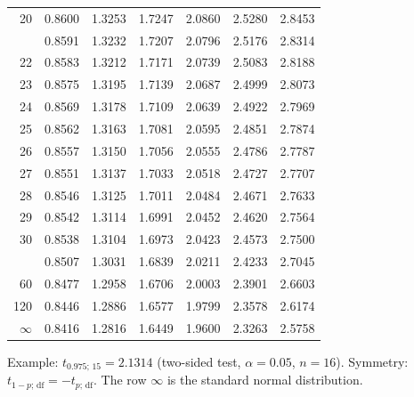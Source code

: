 \documentclass[a4paper]{article}
\theoremstyle{break}
\begin{document}
\begin{table}[H]
\begin{footnotesize}
\begin{tabular}{r*{6}{c}}
20 & 0.8600 & 1.3253 & 1.7247 & 2.0860 & 2.5280 & 2.8453\\
\addlinespace
21 & 0.8591 & 1.3232 & 1.7207 & 2.0796 & 2.5176 & 2.8314\\
22 & 0.8583 & 1.3212 & 1.7171 & 2.0739 & 2.5083 & 2.8188\\
23 & 0.8575 & 1.3195 & 1.7139 & 2.0687 & 2.4999 & 2.8073\\
24 & 0.8569 & 1.3178 & 1.7109 & 2.0639 & 2.4922 & 2.7969\\
25 & 0.8562 & 1.3163 & 1.7081 & 2.0595 & 2.4851 & 2.7874\\
26 & 0.8557 & 1.3150 & 1.7056 & 2.0555 & 2.4786 & 2.7787\\
27 & 0.8551 & 1.3137 & 1.7033 & 2.0518 & 2.4727 & 2.7707\\
28 & 0.8546 & 1.3125 & 1.7011 & 2.0484 & 2.4671 & 2.7633\\
29 & 0.8542 & 1.3114 & 1.6991 & 2.0452 & 2.4620 & 2.7564\\
30 & 0.8538 & 1.3104 & 1.6973 & 2.0423 & 2.4573 & 2.7500\\
\addlinespace
40 & 0.8507 & 1.3031 & 1.6839 & 2.0211 & 2.4233 & 2.7045\\
60 & 0.8477 & 1.2958 & 1.6706 & 2.0003 & 2.3901 & 2.6603\\
120 & 0.8446 & 1.2886 & 1.6577 & 1.9799 & 2.3578 & 2.6174\\
$\infty$ & 0.8416 & 1.2816 & 1.6449 & 1.9600 & 2.3263 & 2.5758\\
\bottomrule
\end{tabular}
\end{footnotesize}

\medskip
{\footnotesize Example: $t_{0.975;\,15}=2.1314$ (two-sided test, $\alpha=0.05$, $n=16$).
Symmetry: $t_{1-p;\,\mathrm{df}}=-t_{p;\,\mathrm{df}}$. The row $\infty$ is the standard normal distribution.\par}
\end{table}
\end{document}
